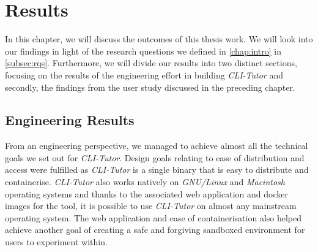 \chapter{Results}
\label{chap:results}


%





In this chapter, we will discuss the outcomes of this thesis work. We will look
into our findings in light of the research questions we defined in
\autoref{chap:intro} in \autoref{subsec:rqs}. Furthermore, we will divide our
results into two distinct sections, focusing on the results of the engineering
effort in building \textit{CLI-Tutor} and secondly, the findings from the user
study discussed in the preceding chapter.


\section{Engineering Results}

From an engineering perspective, we managed to achieve almost all the
technical goals we set out for \textit{CLI-Tutor}. Design goals relating to
ease of distribution and access were fulfilled as \textit{CLI-Tutor} is a single binary that
is easy to distribute and containerise. \textit{CLI-Tutor} also works natively
on  \textit{GNU/Linux} and  \textit{Macintosh} operating systems and thanks to
the associated web application and docker images for the tool, it is possible
to use \textit{CLI-Tutor} on almost any mainstream operating system. The web
application and ease of containerisation also helped achieve another goal of
creating a safe and forgiving sandboxed environment for users to experiment
within.

